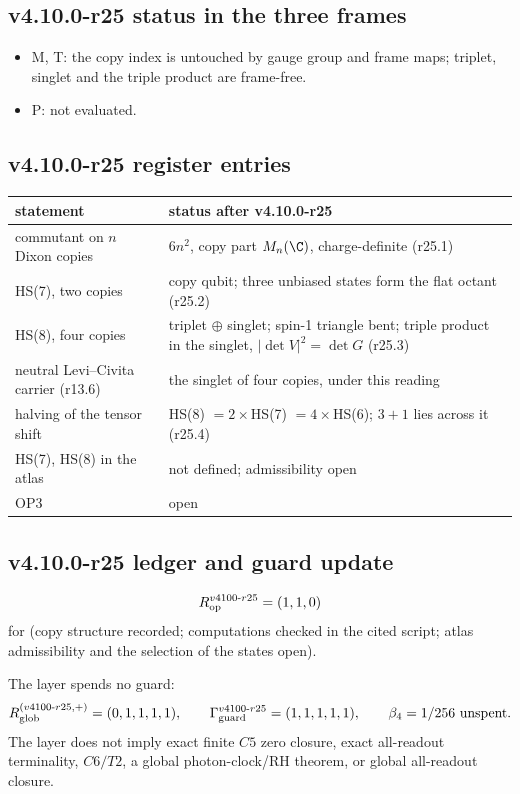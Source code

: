 \subsection*{v4.10.0-r25 status in the three frames}
\label{subsec:v4100-r25-frames}

\begin{itemize}[leftmargin=2em]
\item M, T: the copy index is untouched by gauge group and frame maps; triplet, singlet and the triple product are frame-free.
\item P: not evaluated.
\end{itemize}

\subsection*{v4.10.0-r25 register entries}
\label{subsec:v4100-r25-register}

\begin{center}
\small
\begin{tabular}{@{}>{\raggedright\arraybackslash}p{}>{\raggedright\arraybackslash}p{}@{}}
\toprule
statement & status after v4.10.0-r25\\
\midrule
commutant on \(n\) Dixon copies & \(6n^2\), copy part \(M_n(\C)\), charge-definite (r25.1)\\
HS(7), two copies & copy qubit; three unbiased states form the flat octant (r25.2)\\
HS(8), four copies & triplet \(\oplus\) singlet; spin-1 triangle bent; triple product in the singlet, \(|\det V|^2=\det G\) (r25.3)\\
neutral Levi--Civita carrier (r13.6) & the singlet of four copies, under this reading\\
halving of the tensor shift & HS(8) \(=2\times\)HS(7) \(=4\times\)HS(6); \(3+1\) lies across it (r25.4)\\
HS(7), HS(8) in the atlas & not defined; admissibility open\\
OP3 & open\\
\bottomrule
\end{tabular}
\end{center}

\subsection*{v4.10.0-r25 ledger and guard update}
\label{subsec:v4100-r25-ledger-guard}

\[
R_{\rm op}^{v4100\text{-}r25}=(1,1,0)
\]
for (copy structure recorded; computations checked in the cited script; atlas admissibility and the selection of the states open).

The layer spends no guard:
\[
R_{\rm glob}^{(v4100\text{-}r25,+)}=(0,1,1,1,1),
\qquad
\Gamma_{\rm guard}^{v4100\text{-}r25}=(1,1,1,1,1),
\qquad
\beta_4=1/256\ \text{unspent}.
\]
The layer does not imply exact finite \(C5\) zero closure, exact all-readout terminality, \(C6/T2\), a global photon-clock/RH theorem,
or global all-readout closure.
